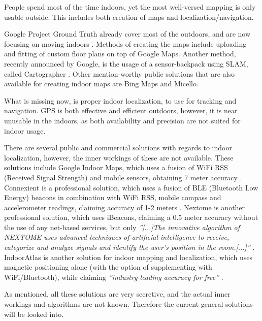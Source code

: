 
People spend most of the time indoors, yet the most well-versed mapping is only usable outside.
This includes both creation of maps and localization/navigation.

Google Project Ground Truth\cite{googleio_ground_truth} already cover most of the outdoors, and are now focusing on moving indoors \cite{googleio_indoor_maps}\cite{indoor_maps_google_slides}.
Methods of creating the maps include uploading and fitting of custom floor plans on top of Google Maps.
Another method, recently announced by Google, is the usage of a sensor-backpack using SLAM, called Cartographer \cite{cartographer}.
Other mention-worthy public solutions that are also available for creating indoor maps are Bing Maps\cite{bingmaps} and Micello\cite{micello}.

What is missing now, is proper indoor localization, to use for tracking and navigation.
GPS \cite{gps} is both effective and efficient outdoors, however, it is near unusable in the indoors, as both availability and precision are not suited for indoor usage.

There are several public and commercial solutions with regards to indoor localization, however, the inner workings of these are not available.
These solutions include Google Indoor Maps, which uses a fusion of WiFi RSS (Received Signal Strength) and mobile sensors, obtaining 7 meter accuracy \cite{googleio_indoor_maps}.
Connexient is a professional solution, which uses a fusion of BLE (Bluetooth Low Energy) beacons in combination with WiFi RSS, mobile compass and accelerometer readings, claiming accuracy of 1-2 meters \cite{connexient_indoor_pos}.
Nextome is another professional solution, which uses iBeacons\cite{ibeacon}, claiming a 0.5 meter accuracy without the use of any net-based services, but only \textit{''[...]The innovative algorithm of NEXTOME uses advanced techniques of artificial intelligence to receive, categorize and analyze signals and identify the user’s position in the room.[...]''} \cite{nextome_indoor_pos}.
IndoorAtlas is another solution for indoor mapping and localization, which uses magnetic positioning alone (with the option of supplementing with WiFi/Bluetooth), while claiming \textit{''industry-leading accuracy for free''} \cite{indooratlas_features}.

As mentioned, all these solutions are very secretive, and the actual inner workings and algorithms are not known.
Therefore the current general solutions will be looked into.
